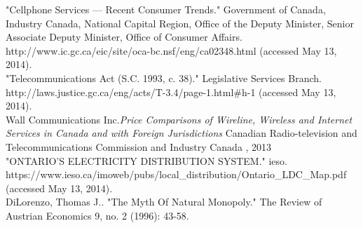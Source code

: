 \documentclass{article}
\begin{document}
"Cellphone Services — Recent Consumer Trends." Government of Canada, Industry Canada, National Capital Region, Office of the Deputy Minister, Senior Associate Deputy Minister, Office of Consumer Affairs.\\ http://www.ic.gc.ca/eic/site/oca-bc.nsf/eng/ca02348.html (accessed May 13, 2014).\\

"Telecommunications Act (S.C. 1993, c. 38)." Legislative Services Branch. http://laws.justice.gc.ca/eng/acts/T-3.4/page-1.html\#h-1 (accessed May 13, 2014).\\

Wall Communications Inc.\textit{Price Comparisons of Wireline, Wireless and Internet Services in Canada and with Foreign Jurisdictions} Canadian Radio-television and Telecommunications Commission and Industry Canada , 2013\\

"ONTARIO’S ELECTRICITY DISTRIBUTION SYSTEM." ieso. 
 \\https://www.ieso.ca/imoweb/pubs/local\_distribution/Ontario\_LDC\_Map.pdf (accessed May 13, 2014).\\

DiLorenzo, Thomas J.. "The Myth Of Natural Monopoly." The Review of Austrian Economics 9, no. 2 (1996): 43-58.\\







%

%
\end{document}
